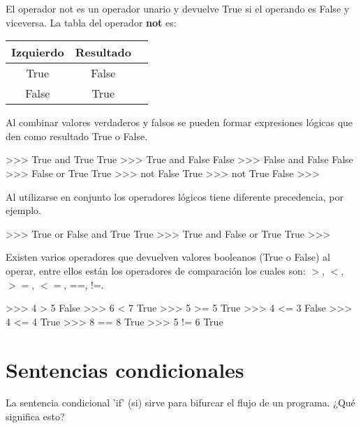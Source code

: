 El operador not es un operador unario y devuelve True si el operando es False y viceversa. La tabla del operador \textbf{not} es:\\

\begin{table}[h]
\centering
\begin{tabular}{|c|c|c|} \hline
Izquierdo    & Resultado      \\ \hline
True         & False        \\ \hline
False        & True        \\ \hline
\end{tabular}
\end{table}

Al combinar valores verdaderos y falsos se pueden formar expresiones lógicas que den como resultado True o False.\\

\begin{pyglist} [language=python]
>>> True and True
True
>>> True and False
False
>>> False and False
False
>>> False or True
True
>>> not False
True
>>> not True
False
>>>
\end{pyglist}


Al utilizarse en conjunto los operadores lógicos tiene diferente precedencia, por ejemplo.\\

\begin{pyglist} [language=python]
>>> True or False and True
True
>>> True and False or True
True
>>> 
\end{pyglist}

Existen varios operadores que devuelven valores booleanos (True o False) al operar, entre ellos están los operadores de comparación los cuales son: $>$, $<$, $>=$, $<=$, ==, !=.\\

\begin{pyglist} [language=python]
>>> 4 > 5
False
>>> 6 < 7
True
>>> 5 >= 5
True
>>> 4 <= 3
False
>>> 4 <= 4
True
>>> 8 == 8
True
>>> 5 != 6
True
\end{pyglist}

\section{Sentencias condicionales}

La sentencia condicional 'if' (si) sirve para bifurcar el flujo de un programa. ¿Qué significa esto?\\

